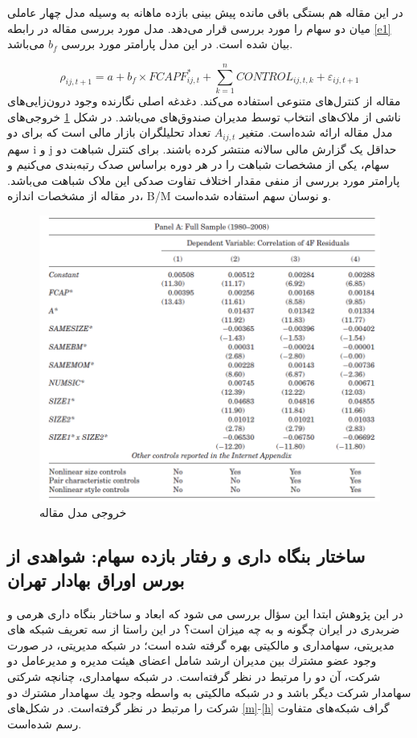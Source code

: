 \documentclass[12pt]{article}
\begin{document}
  در این مقاله هم بستگی باقی مانده 
  پیش بینی بازده ماهانه به وسیله مدل چهار عاملی میان دو سهام را مورد بررسی قرار می‌دهد. مدل مورد بررسی مقاله در رابطه 
  \ref{e1}
  بیان شده است. در این مدل پارامتر مورد بررسی $ b_f $ می‌باشد.
  
  \begin{equation}
  \rho_{ij,t+1} = a + b_f \times FCAPF^*_{ij,t} + \sum_{k = 1}^{n } CONTROL_{ij,t,k} + \varepsilon_{ij,t+1}
  \label{e1}
  \end{equation}
  مقاله از کنترل‌های متنوعی استفاده می‌کند. دغدغه اصلی نگارنده  وجود درون‌زایی‌های ناشی از ملاک‌های انتخاب توسط مدیران صندوق‌های می‌باشد. در شکل 
  \ref{g1}
   خروجی‌های مدل مقاله ارائه شده‌است. متغیر 
   $ A_{ij,t} $
  تعداد تحلیلگران بازار مالی است که برای دو سهم i و j حداقل یک گزارش مالی سالانه منتشر کرده باشند. 
  برای کنترل شباهت‌ دو سهام، یکی از مشخصات شباهت را در هر دوره براساس صدک رتبه‌بندی می‌کنیم و پارامتر مورد بررسی از منفی مقدار اختلاف تفاوت صدکی این ملاک شباهت می‌باشد. در مقاله از مشخصات اندازه، B/M و نوسان سهم استفاده شده‌است.
  \begin{figure}[htbp]
  \centering
  \includegraphics[width=\columnwidth]{Table1.png}
  \caption{ خروجی مدل مقاله  }
  \label{g1}
 
  \end{figure}  
\FloatBarrier


\subsection{ساختار بنگاه داری و رفتار بازده سهام: شواهدی از بورس اوراق بهادار تهران}
\label{s1.2}
در این پژوهش ابتدا این سؤال بررسی می شود كه ابعاد و ساختار بنگاه داری هرمی و ضربدری در ایران چگونه و
به چه میزان است؟ در این راستا از سه تعریف شبكه های مدیریتی، سهامداری و مالكیتی بهره گرفته شده است؛ در
شبكه مدیریتی، در صورت وجود عضو مشترك بین مدیران ارشد شامل اعضای هیئت مدیره و مدیرعامل دو شركت، آن
دو را مرتبط در نظر گرفته‌است. در شبكه سهامداری، چنانچه شركتی سهامدار شركت دیگر باشد و  در شبكه مالكیتی به واسطه وجود یك سهامدار مشترك دو شركت را مرتبط در نظر گرفته‌است. در شکل‌های 
\ref{m}-\ref{h}
گراف شبکه‌های متفاوت رسم شده‌است.
\end{document}
